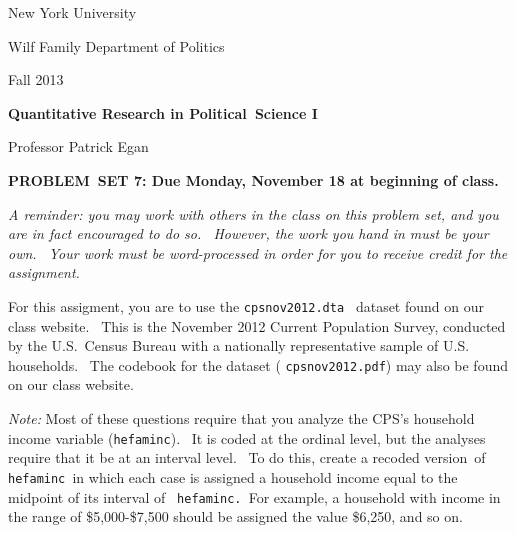 \documentclass[11pt]{article}
\begin{document}
New York University

Wilf Family Department of Politics

Fall 2013

\begin{center}
{\large \textbf{Quantitative Research in Political\ Science I}}

Professor Patrick Egan

\bigskip

\textbf{PROBLEM\ SET 7: Due Monday, November 18 at beginning of class.}
\end{center}

\textit{A reminder: you may work with others in the class on this problem
set, and you are in fact encouraged to do so. \ However, the work you hand
in must be your own. \ Your work must be word-processed in order for you to
receive credit for the assignment.}

\bigskip

For this assigment, you are to use the \texttt{cpsnov2012.dta}\textit{\ }%
dataset found on our class website. \ This is the November 2012 Current
Population Survey, conducted by the U.S.\ Census Bureau with a nationally
representative sample of U.S. households. \ The codebook for the dataset (%
\texttt{cpsnov2012.pdf}) may also be found on our class website.\bigskip\ \ 

\textit{Note: }Most of these questions require that you analyze the CPS's
household income variable (\texttt{hefaminc}). \ It is coded at the ordinal
level, but the analyses require that it be at an interval level. \ To do
this, create a recoded version\ of \texttt{hefaminc }in which each case is
assigned a household income equal to the midpoint of its interval of \texttt{%
hefaminc. }For example, a household with income in the range of
\$5,000-\$7,500 should be assigned the value \$6,250, and so on.\bigskip 
\end{document}
